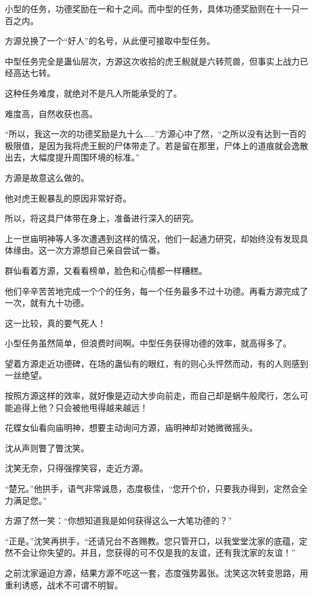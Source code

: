 
\begin{this_body}

小型的任务，功德奖励在一和十之间。而中型的任务，具体功德奖励则在十一只一百之内。

方源兑换了一个“好人”的名号，从此便可接取中型任务。

中型任务完全是蛊仙层次，方源这次收拾的虎王鲵就是六转荒兽，但事实上战力已经高达七转。

这种任务难度，就绝对不是凡人所能承受的了。

难度高，自然收获也高。

“所以，我这一次的功德奖励是九十么……”方源心中了然，“之所以没有达到一百的极限值，是因为我将虎王鲵的尸体带走了。若是留在那里，尸体上的道痕就会逸散出去，大幅度提升周围环境的标准。”

方源是故意这么做的。

他对虎王鲵暴乱的原因非常好奇。

所以，将这具尸体带在身上，准备进行深入的研究。

上一世庙明神等人多次遭遇到这样的情况，他们一起通力研究，却始终没有发现具体缘由。这一次方源想自己亲自尝试一番。

群仙看着方源，又看看榜单，脸色和心情都一样糟糕。

他们辛辛苦苦地完成一个个的任务，每一个任务最多不过十功德。再看方源完成了一次，就有九十功德。

这一比较，真的要气死人！

小型任务虽然简单，但浪费时间啊。中型任务获得功德的效率，就高得多了。

望着方源走近功德碑，在场的蛊仙有的眼红，有的则心头怦然而动，有的人则感到一丝绝望。

按照方源这样的效率，就好像是迈动大步向前走，而自己却是蜗牛般爬行，怎么可能追得上他？只会被他甩得越来越远！

花蝶女仙看向庙明神，想要主动询问方源，庙明神却对她微微摇头。

沈从声则瞥了瞥沈笑。

沈笑无奈，只得强撑笑容，走近方源。

“楚兄。”他拱手，语气非常诚恳，态度极佳，“您开个价，只要我办得到，定然会全力满足您。”

方源了然一笑：“你想知道我是如何获得这么一大笔功德的？”

“正是。”沈笑再拱手，“还请兄台不吝赐教。您只管开口，以我堂堂沈家的底蕴，定然不会让你失望的。并且，您获得的可不仅是我的友谊，还有我沈家的友谊！”

之前沈家逼迫方源，结果方源不吃这一套，态度强势嚣张。沈笑这次转变思路，用重利诱惑，战术不可谓不明智。


\end{this_body}
